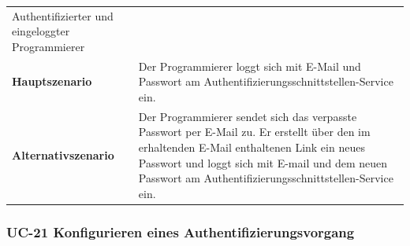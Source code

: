 \begin{longtable}[c]{@{}ll@{}}
\begin{minipage}[t]{0.60\columnwidth}
Authentifizierter und eingeloggter Programmierer
\strut\end{minipage}\tabularnewline
\begin{minipage}[t]{0.34\columnwidth}\raggedright\strut
\textbf{Hauptszenario}
\strut\end{minipage} &
\begin{minipage}[t]{0.60\columnwidth}\raggedright\strut
Der Programmierer loggt sich mit E-Mail und Passwort am
Authentifizierungsschnittstellen-Service ein.
\strut\end{minipage}\tabularnewline
\begin{minipage}[t]{0.34\columnwidth}\raggedright\strut
\textbf{Alternativszenario}
\strut\end{minipage} &
\begin{minipage}[t]{0.60\columnwidth}\raggedright\strut
Der Programmierer sendet sich das verpasste Passwort per E-Mail zu. Er
erstellt über den im erhaltenden E-Mail enthaltenen Link ein neues
Passwort und loggt sich mit E-mail und dem neuen Passwort am
Authentifizierungsschnittstellen-Service ein.
\strut\end{minipage}\tabularnewline
\bottomrule
\end{longtable}

\subsubsection{UC-21 Konfigurieren eines
Authentifizierungsvorgang}\label{uc-21-konfigurieren-eines-authentifizierungsvorgang}

